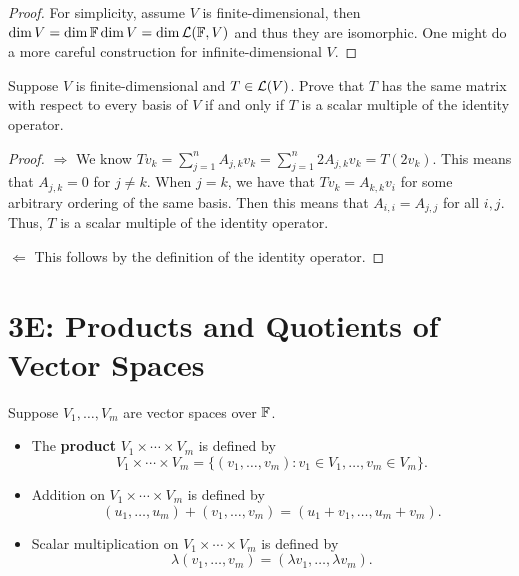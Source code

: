\documentclass{extarticle}
\begin{document}
\begin{proof}
For simplicity, assume \(V\) is finite-dimensional, then \(\dim V = \dim \mathbb{F} \dim V = \dim \mathcal{L}(\mathbb{F}, V)\) and 
thus they are isomorphic. One might do a more careful construction for infinite-dimensional \(V\). 
\end{proof}

\begin{problem}{19}
    Suppose \(V\) is finite-dimensional and \(T \in \mathcal{L}(V)\). Prove that \(T\) has the same matrix with 
    respect to every basis of \(V\) if and only if \(T\) is a scalar multiple of the identity operator.
\end{problem}

\begin{proof}
\(\Rightarrow\) We know \(T v_k = \sum_{j=1}^{n} A_{j, k} v_k = \sum_{j=1}^{n} 2 A_{j, k} v_k
= T (2v_k)\). This means that \(A_{j, k} = 0\) for \(j \neq k\). When \(j = k\), we have that 
\(T v_k = A_{k, k} v_i\) for some arbitrary ordering of the same basis. Then this means that 
\(A_{i, i} = A_{j, j}\) for all \(i, j\). Thus, \(T\) is a scalar multiple of the identity operator. 

\(\Leftarrow\) This follows by the definition of the identity operator. 
\end{proof}

\newpage 

\section*{3E: Products and Quotients of Vector Spaces}

\begin{definition}
    Suppose \(V_1, \ldots, V_m\) are vector spaces over \(\mathbb{F}\). 
    \begin{itemize}
        \item The \textbf{product} \(V_1 \times \cdots \times V_m\) is defined by 
        \[V_1 \times \cdots \times V_m = \{(v_1, \ldots, v_m) \colon 
        v_1 \in V_1, \ldots, v_m \in V_m\}.\]
        \item Addition on \(V_1 \times \cdots \times V_m\) is defined by 
        \[(u_1, \ldots, u_m) + (v_1, \ldots, v_m) = (u_1 + v_1, \ldots, u_m + v_m).\]
        \item Scalar multiplication on \(V_1 \times \cdots \times V_m\) is defined by 
        \[\lambda(v_1, \ldots, v_m) = (\lambda v_1, \ldots, \lambda v_m).\]
    \end{itemize}
\end{definition}
\end{document}
